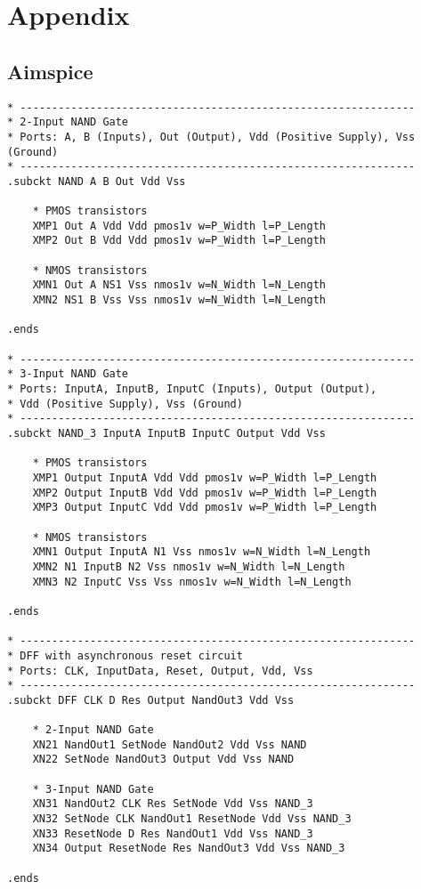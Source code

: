 \section{Appendix}
\subsection{Aimspice}

\begin{lstlisting}
* --------------------------------------------------------------
* 2-Input NAND Gate
* Ports: A, B (Inputs), Out (Output), Vdd (Positive Supply), Vss (Ground)
* --------------------------------------------------------------
.subckt NAND A B Out Vdd Vss

    * PMOS transistors
    XMP1 Out A Vdd Vdd pmos1v w=P_Width l=P_Length 
    XMP2 Out B Vdd Vdd pmos1v w=P_Width l=P_Length 

    * NMOS transistors
    XMN1 Out A NS1 Vss nmos1v w=N_Width l=N_Length 
    XMN2 NS1 B Vss Vss nmos1v w=N_Width l=N_Length 

.ends

* --------------------------------------------------------------
* 3-Input NAND Gate
* Ports: InputA, InputB, InputC (Inputs), Output (Output), 
* Vdd (Positive Supply), Vss (Ground)
* --------------------------------------------------------------
.subckt NAND_3 InputA InputB InputC Output Vdd Vss

    * PMOS transistors
    XMP1 Output InputA Vdd Vdd pmos1v w=P_Width l=P_Length 
    XMP2 Output InputB Vdd Vdd pmos1v w=P_Width l=P_Length
    XMP3 Output InputC Vdd Vdd pmos1v w=P_Width l=P_Length

    * NMOS transistors
    XMN1 Output InputA N1 Vss nmos1v w=N_Width l=N_Length 
    XMN2 N1 InputB N2 Vss nmos1v w=N_Width l=N_Length
    XMN3 N2 InputC Vss Vss nmos1v w=N_Width l=N_Length  

.ends

* --------------------------------------------------------------
* DFF with asynchronous reset circuit
* Ports: CLK, InputData, Reset, Output, Vdd, Vss
* --------------------------------------------------------------
.subckt DFF CLK D Res Output NandOut3 Vdd Vss

    * 2-Input NAND Gate
    XN21 NandOut1 SetNode NandOut2 Vdd Vss NAND
    XN22 SetNode NandOut3 Output Vdd Vss NAND

    * 3-Input NAND Gate
    XN31 NandOut2 CLK Res SetNode Vdd Vss NAND_3 
    XN32 SetNode CLK NandOut1 ResetNode Vdd Vss NAND_3 
    XN33 ResetNode D Res NandOut1 Vdd Vss NAND_3 
    XN34 Output ResetNode Res NandOut3 Vdd Vss NAND_3 

.ends
\end{lstlisting}

